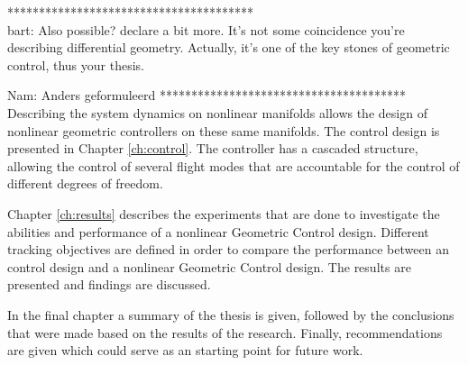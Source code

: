 ***************************************\\
bart: Also possible? declare a bit more.
It's not some coincidence you're describing differential geometry.
Actually, it's one of the key stones of geometric control, thus your thesis.

Nam: Anders geformuleerd
***************************************\\

Describing the system dynamics on nonlinear manifolds allows the design of nonlinear geometric controllers on these same manifolds. The control design is presented in Chapter \ref{ch:control}. The controller has a cascaded structure, allowing the control of several flight modes that are accountable for the control of different degrees of freedom.

Chapter \ref{ch:results} describes the experiments that are done to investigate the abilities and performance of a nonlinear Geometric Control design. 
Different tracking objectives are defined in order to compare the performance between an  control design and a nonlinear Geometric Control design. 
The results are presented and findings are discussed.

In the final chapter a summary of the thesis is given, followed by the conclusions that were made based on the results of the research.
Finally, recommendations are given which could serve as an starting point for future work. 

